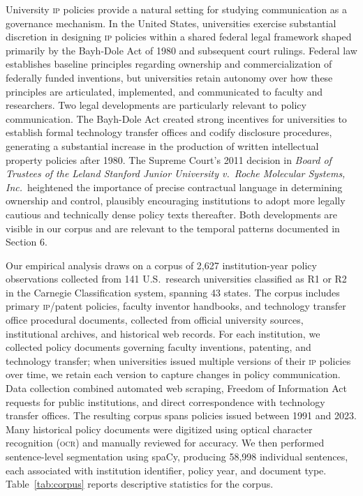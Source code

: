 \documentclass[12pt]{article}
\newcommand{\IP}{\textsc{ip}}
\begin{document}
University \IP{} policies provide a natural setting for studying communication as a
governance mechanism.  In the United States, universities exercise substantial
discretion in designing \IP{} policies within a shared federal legal framework shaped
primarily by the Bayh-Dole Act of 1980 and subsequent court rulings.  Federal law
establishes baseline principles regarding ownership and commercialization of federally
funded inventions, but universities retain autonomy over how these principles are
articulated, implemented, and communicated to faculty and researchers.  Two legal
developments are particularly relevant to policy communication.  The Bayh-Dole Act
created strong incentives for universities to establish formal technology transfer
offices and codify disclosure procedures, generating a substantial increase in the
production of written intellectual property policies after 1980.  The Supreme Court's
2011 decision in \textit{Board of Trustees of the Leland Stanford Junior University
v.\ Roche Molecular Systems, Inc.}\ heightened the importance of precise contractual
language in determining ownership and control, plausibly encouraging institutions to
adopt more legally cautious and technically dense policy texts thereafter.  Both
developments are visible in our corpus and are relevant to the temporal patterns
documented in Section 6.

Our empirical analysis draws on a corpus of 2,627 institution-year policy observations
collected from 141 U.S.\ research universities classified as R1 or R2 in the Carnegie
Classification system, spanning 43 states.  The corpus includes primary
\IP{}/patent policies, faculty inventor handbooks, and technology transfer office
procedural documents, collected from official university sources, institutional
archives, and historical web records.  For each institution, we collected policy
documents governing faculty inventions, patenting, and technology transfer; when
universities issued multiple versions of their \IP{} policies over time, we retain each
version to capture changes in policy communication.  Data collection combined automated
web scraping, Freedom of Information Act requests for public institutions, and direct
correspondence with technology transfer offices.  The resulting corpus spans policies
issued between 1991 and 2023.  Many historical policy documents were digitized using
optical character recognition (\textsc{ocr}) and manually reviewed for accuracy.
We then performed sentence-level segmentation using spaCy, producing 58,998 individual
sentences, each associated with institution identifier, policy year, and document type.
Table~\ref{tab:corpus} reports descriptive statistics for the corpus.
\end{document}
